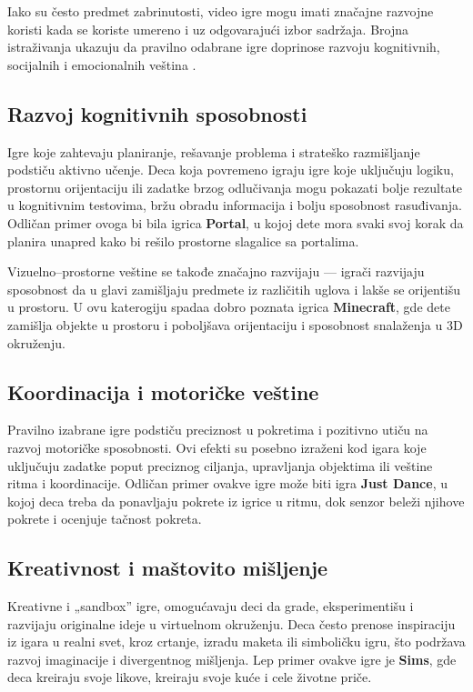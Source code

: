 \documentclass[a4paper,12pt]{article}
\begin{document}
Iako su često predmet zabrinutosti, video igre mogu imati značajne razvojne koristi kada se koriste umereno i uz odgovarajući izbor sadržaja. Brojna istraživanja ukazuju da pravilno odabrane igre doprinose razvoju kognitivnih, socijalnih i emocionalnih veština \cite{granic2014benefits}.

\subsection*{Razvoj kognitivnih sposobnosti}
Igre koje zahtevaju planiranje, rešavanje problema i strateško razmišljanje podstiču aktivno učenje. 
Deca koja povremeno igraju igre koje uključuju logiku, prostornu orijentaciju ili zadatke brzog odlučivanja mogu pokazati bolje rezultate u kognitivnim testovima, bržu obradu informacija i bolju sposobnost rasuđivanja. Odličan primer ovoga bi bila igrica \textbf{Portal}, u kojoj dete mora svaki svoj korak da planira unapred kako bi rešilo prostorne slagalice sa portalima.

Vizuelno–prostorne veštine se takođe značajno razvijaju — igrači razvijaju sposobnost da u glavi zamišljaju predmete iz različitih uglova i lakše se orijentišu u prostoru. U ovu katerogiju spadaa dobro poznata igrica \textbf{Minecraft}, gde dete zamišlja objekte u prostoru i poboljšava orijentaciju i sposobnost snalaženja u 3D okruženju.

\subsection*{Koordinacija i motoričke veštine}
Pravilno izabrane igre podstiču preciznost u pokretima i pozitivno utiču na razvoj motoričke sposobnosti.
Ovi efekti su posebno izraženi kod igara koje uključuju zadatke poput preciznog ciljanja, upravljanja objektima ili veštine ritma i koordinacije. Odličan primer ovakve igre može biti igra \textbf{Just Dance}, u kojoj deca treba da ponavljaju pokrete iz igrice u ritmu, dok senzor beleži njihove pokrete i ocenjuje tačnost pokreta.

\subsection*{Kreativnost i maštovito mišljenje}
Kreativne i „sandbox” igre, omogućavaju deci da grade, eksperimentišu i razvijaju originalne ideje u virtuelnom okruženju. 
Deca često prenose inspiraciju iz igara u realni svet, kroz crtanje, izradu maketa ili simboličku igru, što podržava razvoj imaginacije i divergentnog mišljenja. Lep primer ovakve igre je \textbf{Sims}, gde deca kreiraju svoje likove, kreiraju svoje kuće i cele životne priče.
\end{document}
